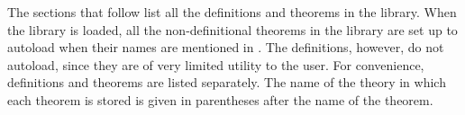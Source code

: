 The sections that follow list all the definitions and theorems in the
 library. When the library is loaded, all the non-definitional
theorems in the library are set up to autoload when their names are mentioned
in \ML.  The definitions, however, do not autoload, since they are of very
limited utility to the user.  For convenience, definitions and theorems are
listed separately.  The name of the theory in which each theorem is stored is
given in parentheses after the name of the theorem.
